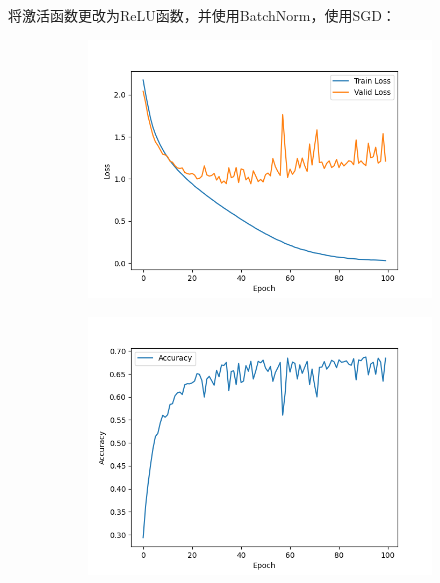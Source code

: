 \documentclass[11pt, a4paper]{article}
\begin{document}
\subsection{}
将激活函数更改为ReLU函数，并使用BatchNorm，使用SGD：
\begin{figure}[H]
    \hfill
    \begin{subfigure}[t]{0.45\linewidth}
        \includegraphics[width=\textwidth]{img/Q4/2/Acc.png}
    \end{subfigure}
    \hfill
    \begin{subfigure}[t]{0.45\linewidth}
        \includegraphics[width=\textwidth]{img/Q4/2/Loss.png}
    \end{subfigure}
    \hfill
\end{figure}
\end{document}

